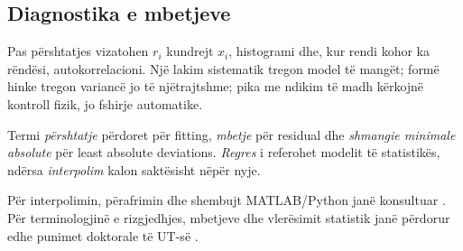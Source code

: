 \subsection{Diagnostika e mbetjeve}
Pas përshtatjes vizatohen $r_i$ kundrejt $x_i$, histogrami dhe, kur rendi kohor ka rëndësi, autokorrelacioni. Një lakim sistematik tregon model të mangët; formë hinke tregon variancë jo të njëtrajtshme; pika me ndikim të madh kërkojnë kontroll fizik, jo fshirje automatike.

\begin{kujdes}
Termi \emph{përshtatje} përdoret për fitting, \emph{mbetje} për residual dhe \emph{shmangie minimale absolute} për least absolute deviations. \emph{Regres} i referohet modelit të statistikës, ndërsa \emph{interpolim} kalon saktësisht nëpër nyje.
\end{kujdes}

Për interpolimin, përafrimin dhe shembujt MATLAB/Python janë konsultuar \cite{hanelli,hoxha,datja}. Për terminologjinë e rizgjedhjes, mbetjeve dhe vlerësimit statistik janë përdorur edhe punimet doktorale të UT-së \cite{butka,tasho}.
